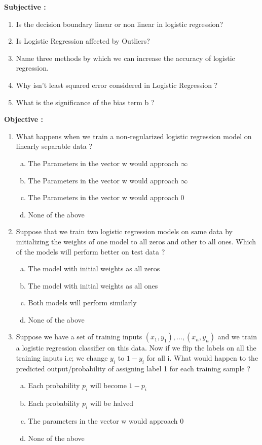 \documentclass[12pt,a4paper]{article}
\begin{document}
{\textbf{Subjective : }
\begin{enumerate}
    \item Is the decision boundary linear or non linear in logistic regression?
    \item  Is Logistic Regression affected by Outliers?
    \item Name three methods by which we can increase the accuracy of
logistic regression.
    \item Why isn't least squared error considered in Logistic Regression ?
    \item What is the significance of the bias term b ?\\[10pt]
\end{enumerate}


\textbf{Objective : }
\begin{enumerate}[1)]
    \item What happens when we train a non-regularized logistic regression model on linearly separable data ?
    \begin{enumerate}[a)]
        \item The Parameters in the vector w would approach $\infty$
        \item The Parameters in the vector w would approach $\infty$
        \item The Parameters in the vector w would approach 0
        \item None of the above
    \end{enumerate} 
     \item Suppose that we train two logistic regression models on same data by initializing the weights of one model to all zeros and other to all ones. Which of the models will perform better on test data ?
    \begin{enumerate}[a)]
        \item  The model with initial weights as all zeros 
        \item The model with initial weights as all ones 
        \item  Both models will perform similarly 
        \item None of the above
    \end{enumerate}
    \item Suppose we have a set of training inputs $(x_1,y_1),...,(x_n,y_n)$ and we train a logistic regression classifier on this data. Now if we flip the labels on all the training inputs i.e; we change $y_i$ to $1-y_i$ for all i. What would happen to the predicted output/probability of assigning label 1 for each training sample ?
    \begin{enumerate}[a)]
        \item  Each probability $p_i$ will become $1-p_i$
        \item Each probability $p_i$ will be halved
        \item The parameters in the vector w would approach 0
        \item None of the above
    \end{enumerate}
\end{enumerate}


}
\end{document}
